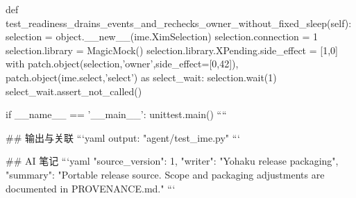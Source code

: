     def test_readiness_drains_events_and_rechecks_owner_without_fixed_sleep(self):
        selection = object.__new__(ime.XimSelection)
        selection.connection = 1
        selection.library = MagicMock()
        selection.library.XPending.side_effect = [1,0]
        with patch.object(selection,'owner',side_effect=[0,42]), patch.object(ime.select,'select') as select_wait:
            selection.wait(1)
            select_wait.assert_not_called()


if __name__ == '__main__':
    unittest.main()
````

## 输出与关联
```yaml
output: "agent/test_ime.py"
```

## AI 笔记
```yaml
{"source_version": 1, "writer": "Yohaku release packaging", "summary": "Portable release source. Scope and packaging adjustments are documented in PROVENANCE.md."}
```
